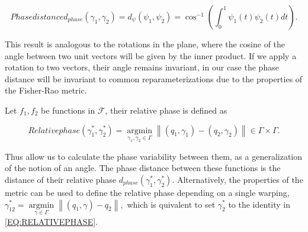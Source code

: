 \begin{equation}[]{Phase distance}
d_{phase}(\gamma_1, \gamma_2) = d_{\psi}(\psi_1, \psi_2) =
\cos^{-1}\left (\int_0^1 \psi_1(t) \psi_2(t) dt\right ).
\end{equation}

This result is analogous to the rotations in the plane, where the cosine of
the angle between two unit vectors will be given by the inner product.
If we apply a rotation to two vectors, their angle remains invariant, in our
case the phase distance will be invariant to common reparameterizations due to
the properties of the Fisher-Rao metric.

Let $f_1, f_2$ be functions in $\mathcal{F}$, their relative phase is defined as

\begin{equation}[EQ:RELATIVEPHASE]{Relative phase}
\left(\gamma_{1}^{*}, \gamma_{2}^{*}\right)=\underset{\gamma_{1}, \gamma_{2} \in \Gamma}{\operatorname{argmin}}\left\|\left(q_{1}, \gamma_{1}\right)-\left(q_{2}, \gamma_{2}\right)\right\| \in \Gamma \times \Gamma.
\end{equation}

Thus allow us to calculate the phase variability between them,
as a generalization of the notion of an angle. The phase distance between these
functions is the distance of their relative phase
$d_{phase} (\gamma_{1}^{*}, \gamma_{2}^{*})$. Alternatively, the properties of
the metric can be used to define the relative phase depending on a single warping,
$
\gamma_{12}^{*}=\underset{\gamma \in \Gamma}{\operatorname{argmin}}\left\|\left(q_{1}, \gamma \right)- q_{2}\right\|,
$
which is quivalent to set $\gamma_2^*$ to the identity in \ref{EQ:RELATIVEPHASE}.
